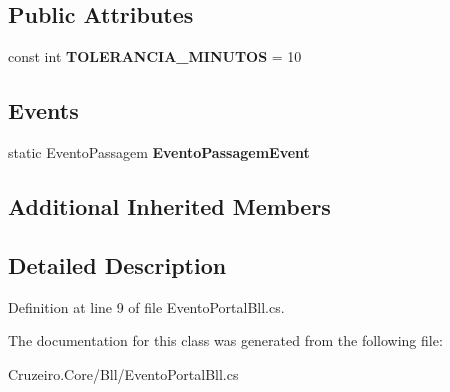 \subsection*{Public Attributes}
\begin{DoxyCompactItemize}
\item 
const int {\bfseries T\+O\+L\+E\+R\+A\+N\+C\+I\+A\+\_\+\+M\+I\+N\+U\+T\+OS} = 10\hypertarget{class_cruzeiro_1_1_core_1_1_bll_1_1_evento_portal_bll_a097e639d9ab6247da79babfa3a78b473}{}\label{class_cruzeiro_1_1_core_1_1_bll_1_1_evento_portal_bll_a097e639d9ab6247da79babfa3a78b473}

\end{DoxyCompactItemize}
\subsection*{Events}
\begin{DoxyCompactItemize}
\item 
static Evento\+Passagem {\bfseries Evento\+Passagem\+Event}\hypertarget{class_cruzeiro_1_1_core_1_1_bll_1_1_evento_portal_bll_ad4a4faf991175f293c890b3741362e55}{}\label{class_cruzeiro_1_1_core_1_1_bll_1_1_evento_portal_bll_ad4a4faf991175f293c890b3741362e55}

\end{DoxyCompactItemize}
\subsection*{Additional Inherited Members}


\subsection{Detailed Description}


Definition at line 9 of file Evento\+Portal\+Bll.\+cs.



The documentation for this class was generated from the following file\+:\begin{DoxyCompactItemize}
\item 
Cruzeiro.\+Core/\+Bll/Evento\+Portal\+Bll.\+cs\end{DoxyCompactItemize}
